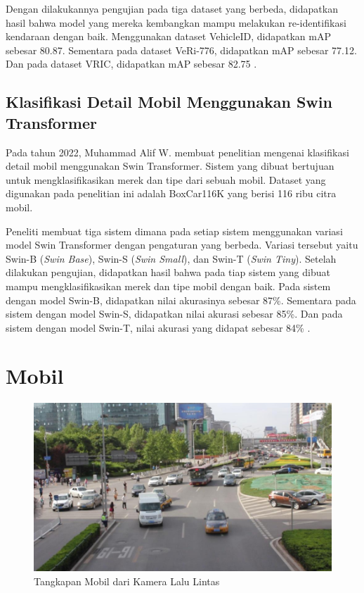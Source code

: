Dengan dilakukannya pengujian pada tiga dataset yang berbeda, didapatkan hasil bahwa model yang mereka kembangkan 
mampu melakukan re-identifikasi kendaraan dengan baik. Menggunakan dataset VehicleID, didapatkan mAP sebesar 80.87. 
Sementara  pada dataset VeRi-776, didapatkan mAP sebesar 77.12. Dan pada dataset VRIC, didapatkan mAP sebesar 
82.75 \parencite{Rong2021}.

\subsection{Klasifikasi Detail Mobil Menggunakan Swin Transformer}

Pada tahun 2022, Muhammad Alif W. membuat penelitian mengenai klasifikasi detail mobil menggunakan Swin Transformer. 
Sistem yang dibuat bertujuan untuk mengklasifikasikan merek dan tipe dari sebuah mobil. Dataset yang digunakan 
pada penelitian ini adalah BoxCar116K yang berisi 116 ribu citra mobil.

Peneliti membuat tiga sistem dimana pada setiap sistem menggunakan variasi model Swin Transformer dengan pengaturan 
yang berbeda. Variasi tersebut yaitu Swin-B (\emph{Swin Base}), Swin-S (\emph{Swin Small}), dan Swin-T (\emph{Swin Tiny}). 
Setelah dilakukan pengujian, didapatkan hasil bahwa pada tiap sistem yang dibuat mampu mengklasifikasikan merek 
dan tipe mobil dengan baik. Pada sistem dengan model Swin-B, didapatkan nilai akurasinya sebesar 87\%. 
Sementara pada sistem dengan model Swin-S, didapatkan nilai akurasi sebesar 85\%. Dan pada sistem dengan 
model Swin-T, nilai akurasi yang didapat sebesar 84\% \parencite{Wicaksono2022}.

\section{Mobil}
\label{sec:mobil}

\begin{figure}[ht]
  \centering
  \includegraphics[scale=0.35]{gambar/Mobil2.jpg}
  \caption{Tangkapan Mobil dari Kamera Lalu Lintas}
  \label{fig:tangkapanmobildarikameralalulintas}
\end{figure}

